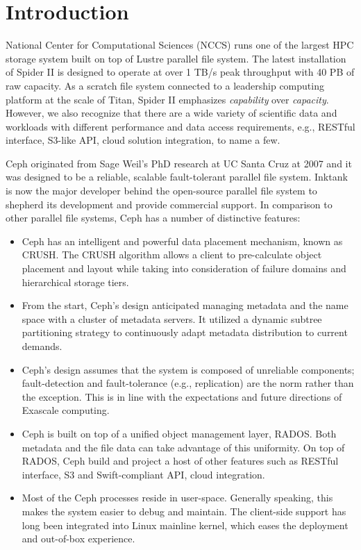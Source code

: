 \section{Introduction}

National Center for Computational Sciences (NCCS) runs one of the largest HPC
storage system built on top of Lustre parallel file system. The latest
installation of Spider II\cite{spider2} is designed to operate at over 1 TB/s peak
throughput with 40 PB of raw capacity. As a scratch file system connected to a
leadership computing platform at the scale of Titan, Spider II emphasizes
\textit{capability} over \textit{capacity}. However, we also recognize that
there are a wide variety of scientific data and workloads with different
performance and data access requirements, e.g., RESTful interface, S3-like
API, cloud solution integration, to name a few. 

Ceph\cite{Weil:2006:Ceph} originated from Sage Weil's PhD research at UC Santa
Cruz at 2007 and it was designed to be a reliable, scalable fault-tolerant
parallel file system.  Inktank is now the major developer behind the
open-source parallel file system to shepherd its development and provide
commercial support.  In comparison to other parallel file systems, Ceph has a
number of distinctive features:

\begin{itemize}
 
\item Ceph has an intelligent and powerful data placement mechanism, known as
  CRUSH. The CRUSH algorithm allows a client to pre-calculate object
  placement and layout while taking into consideration of failure domains and
  hierarchical storage tiers.
  
  \item From the start, Ceph's design anticipated managing metadata and the
  name space with a cluster of metadata servers. It utilized a dynamic subtree
  partitioning strategy to continuously adapt metadata distribution to current
  demands.

  \item Ceph's design assumes that the system is composed of unreliable
  components; fault-detection and fault-tolerance (e.g., replication) are the
  norm rather than the exception. This is in line with the expectations and
  future directions of Exascale computing.

  \item Ceph is built on top of a unified object management layer, RADOS. Both
  metadata and the file data can take advantage of this uniformity. On top of
  RADOS, Ceph build and project a host of other features such as RESTful
  interface, S3 and Swift-compliant API, cloud integration.

\item Most of the Ceph processes reside in user-space. Generally speaking, this makes the
system easier to debug and maintain. The client-side support has long been
integrated into Linux mainline kernel, which eases the deployment and out-of-box
experience.

\end{itemize}

